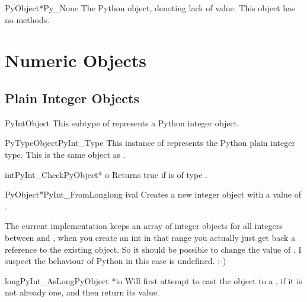 \documentclass{manual}
\begin{document}
\begin{cvardesc}{PyObject*}{Py_None}
The Python  object, denoting lack of value.  This object has
no methods.
\end{cvardesc}


\section{Numeric Objects \label{numericObjects}}



\subsection{Plain Integer Objects \label{intObjects}}

\begin{ctypedesc}{PyIntObject}
This subtype of  represents a Python integer object.
\end{ctypedesc}

\begin{cvardesc}{PyTypeObject}{PyInt_Type}
This instance of  represents the Python plain 
integer type.  This is the same object as .
\end{cvardesc}

\begin{cfuncdesc}{int}{PyInt_Check}{PyObject* o}
Returns true if  is of type .
\end{cfuncdesc}

\begin{cfuncdesc}{PyObject*}{PyInt_FromLong}{long ival}
Creates a new integer object with a value of .

The current implementation keeps an array of integer objects for all
integers between  and , when you create an int in
that range you actually just get back a reference to the existing
object. So it should be possible to change the value of . I
suspect the behaviour of Python in this case is undefined. :-)
\end{cfuncdesc}

\begin{cfuncdesc}{long}{PyInt_AsLong}{PyObject *io}
Will first attempt to cast the object to a , if
it is not already one, and then return its value.
\end{cfuncdesc}
\end{document}
